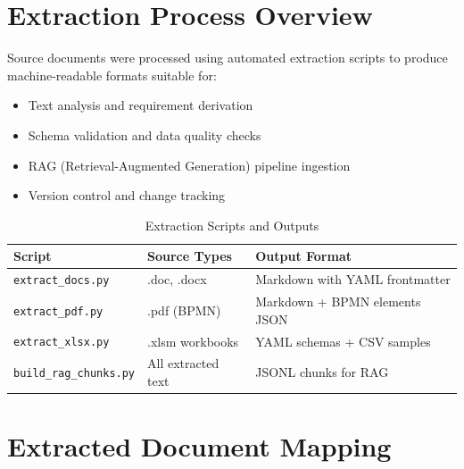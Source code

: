 \documentclass[11pt,a4paper,twoside]{report}
\begin{document}
\section{Extraction Process Overview}
\label{sec:extraction-overview}

Source documents were processed using automated extraction scripts to
produce machine-readable formats suitable for:

\begin{itemize}[noitemsep]
\item Text analysis and requirement derivation
\item Schema validation and data quality checks
\item RAG (Retrieval-Augmented Generation) pipeline ingestion
\item Version control and change tracking
\end{itemize}

\begin{table}[h]
\centering
\caption{Extraction Scripts and Outputs}
\label{tab:extraction-scripts}
\begin{tabularx}{\textwidth}{@{}L{3.5cm}L{4cm}L{6.5cm}@{}}
\toprule
\textbf{Script} & \textbf{Source Types} & \textbf{Output Format} \\
\midrule
\texttt{extract\_docs.py} & .doc, .docx & Markdown with YAML frontmatter \\
\texttt{extract\_pdf.py} & .pdf (BPMN) & Markdown + BPMN elements JSON \\
\texttt{extract\_xlsx.py} & .xlsm workbooks & YAML schemas + CSV samples \\
\texttt{build\_rag\_chunks.py} & All extracted text & JSONL chunks for RAG \\
\bottomrule
\end{tabularx}
\end{table}

\section{Extracted Document Mapping}
\label{sec:extracted-mapping}
\end{document}
